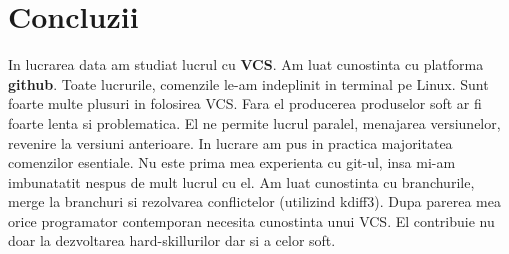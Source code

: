 \documentclass[12pt]{article}
\newcommand\tab[1][1cm]{\hspace*{#1}}
\begin{document}

\cleardoublepage

\newpage

\setcounter{page}{1}
\setcounter{secnumdepth}{4}

\cleardoublepage


\cleardoublepage


\cleardoublepage



\cleardoublepage


\cleardoublepage


\cleardoublepage

\section{Concluzii}
\tab In lucrarea data am studiat lucrul cu \textbf{VCS}. Am luat cunostinta cu platforma
\textbf{github}. Toate lucrurile, comenzile le-am indeplinit in terminal pe Linux.
Sunt foarte multe plusuri in folosirea VCS. Fara el producerea produselor soft ar fi
foarte lenta si problematica. El ne permite lucrul paralel, menajarea versiunelor, 
revenire la versiuni anterioare. In lucrare am pus in practica majoritatea comenzilor
esentiale. Nu este prima mea experienta cu git-ul, insa mi-am imbunatatit nespus de mult
lucrul cu el. Am luat cunostinta cu branchurile, merge la branchuri si rezolvarea
conflictelor (utilizind kdiff3). Dupa parerea mea orice programator contemporan necesita
cunostinta unui VCS. El contribuie nu doar la dezvoltarea hard-skillurilor dar si a celor
soft.
\end{document}
